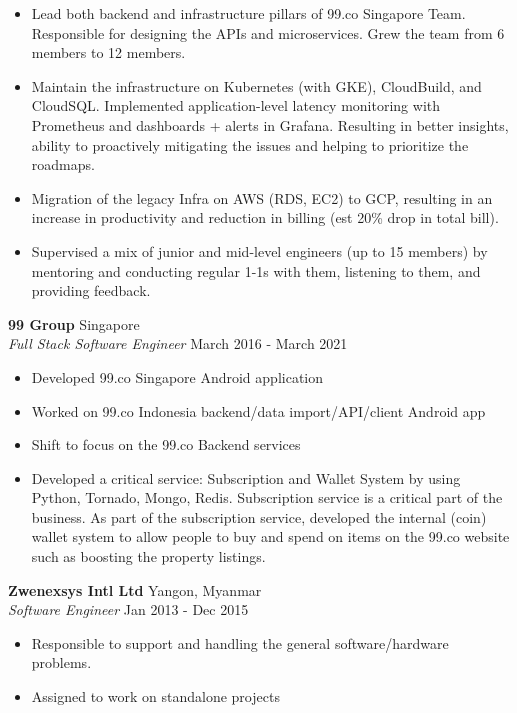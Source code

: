 \documentclass[a4paper]{article}
\begin{document}
\begin{itemize} \itemsep 1pt
	\item Lead both backend and infrastructure pillars of 99.co Singapore Team. Responsible for designing the APIs and microservices. Grew the team from 6 members to 12 members.
	\item Maintain the infrastructure on Kubernetes (with GKE), CloudBuild, and CloudSQL. Implemented application-level latency monitoring with Prometheus and dashboards + alerts in Grafana. Resulting in better insights, ability to proactively mitigating the issues and helping to prioritize the roadmaps.
	\item Migration of the legacy Infra on AWS (RDS, EC2) to GCP, resulting in an increase in productivity and reduction in billing (est 20\% drop in total bill).
	\item Supervised a mix of junior and mid-level engineers (up to 15 members) by mentoring and conducting regular 1-1s with them, listening to them, and providing feedback.
\end{itemize}
\textbf{99 Group} \hfill Singapore\\
\textit{Full Stack Software Engineer} \hfill March 2016 - March 2021\\
\vspace{-1mm}
\begin{itemize} \itemsep 1pt
	\item Developed 99.co Singapore Android application
	\item Worked on 99.co Indonesia backend/data import/API/client Android app
	\item Shift to focus on the 99.co Backend services
	\item Developed a critical service: Subscription and Wallet System by using Python, Tornado, Mongo, Redis. Subscription service is a critical part of the business. As part of the subscription service, developed the internal (coin) wallet system to allow people to buy and spend on items on the 99.co website such as boosting the property listings.
\end{itemize}
\textbf{Zwenexsys Intl Ltd} \hfill Yangon, Myanmar\\
\textit{Software Engineer} \hfill Jan 2013 - Dec 2015\\
\vspace{-1mm}
\begin{itemize} \itemsep 1pt
	\item Responsible to support and handling the general software/hardware problems.
	\item Assigned to work on standalone projects
\end{itemize}
\end{document}
